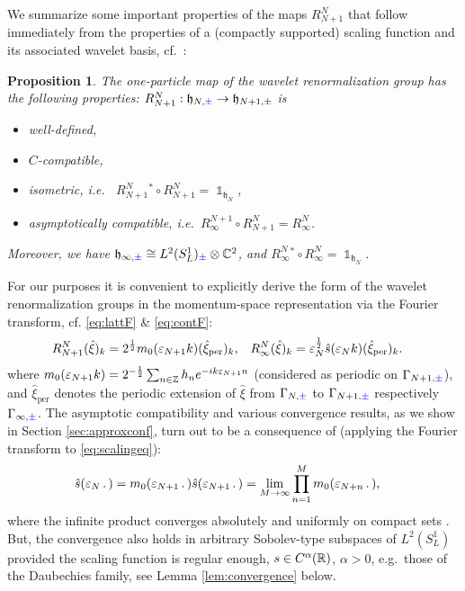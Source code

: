 \documentclass[a4paper, 11pt]{article}
\newcommand{\fh}{\mathfrak{h}}
\DeclareMathOperator{\1}{\mathds{1}}
\DeclareMathOperator{\per}{per}
\newtheorem{prop}[thm]{Proposition}
\begin{document}
We summarize some important properties of the maps $R^{N}_{N+1}$ that follow immediately from the properties of a (compactly supported) scaling function and its associated wavelet basis, cf.~\cite{MeyerWaveletsAndOperators, DaubechiesTenLecturesOn, MorinelliScalingLimitsOf}:
\begin{prop}
\label{prop:waveletrg}
The one-particle map of the wavelet renormalization group has the following properties: $R^{N}_{N+1}:\fh_{N,{\color{blue}\pm}}\rightarrow\fh_{N+1,\pm}$ is
\begin{itemize}
	\item[1.] well-defined,
	\item[2.] $C$-compatible,
	\item[3.] isometric, i.e.~ $R^{N}_{N+1}{}^{\!\!*}\circ R^{N}_{N+1} = \1_{\fh_{N}}$, 
	\item[4.] asymptotically compatible, i.e.~$R^{N+1}_{\infty}\circ R^{N}_{N+1} = R^{N}_{\infty}$.
\end{itemize}
Moreover, we have $\fh_{\infty,{\color{blue}\pm}}\cong L^{2}(S^{1}_{L})_{{\color{blue}\pm}}\otimes\C^{2}$, and $R^{N}_{\infty}{}^{*}\circ R^{N}_{\infty} = \1_{\fh_{N}}$.
\end{prop}
For our purposes it is convenient to explicitly derive the form of the wavelet renormalization groups in the momentum-space representation via the Fourier transform, cf. \eqref{eq:lattF} \& \eqref{eq:contF}:
\begin{align}
\label{eq:waveletrg1pF}
R^{N}_{N+1}(\hat{\xi})_{k} & = 2^{\frac{1}{2}}m_{0}(\vep_{N+1}k)(\hat{\xi}_{\per})_{k}, & R^{N}_{\infty}(\hat{\xi})_{k} & = \vep_{N}^{\frac{1}{2}}\hat{s}(\vep_{N}k)(\hat{\xi}_{\per})_{k}.
\end{align}
where $m_{0}(\varepsilon_{N+1}k) = 2^{-\frac{1}{2}}\sum_{n\in\mathbb{Z}}h_{n}e^{-ik\varepsilon_{N+1}n}$ (considered as periodic on $\Gamma_{N+1,{\color{blue}\pm}}$), and $\hat{\xi}_{\per}$ denotes the periodic extension of $\hat{\xi}$ from $\Gamma_{N,{\color{blue}\pm}}$ to $\Gamma_{N+1,{\color{blue}\pm}}$ respectively $\Gamma_{\infty,{\color{blue}\pm}}$. The asymptotic compatibility and various convergence results, as we show in Section \ref{sec:approxconf}, turn out to be a consequence of (applying the Fourier transform to \eqref{eq:scalingeq}):
\begin{align}
\label{eq:infprod}
\hat{s}(\vep_{N}\!\ .\!\ ) & = m_{0}(\vep_{N+1}\!\ .\!\ )\hat{s}(\vep_{N+1}\!\ .\!\ ) = \lim_{M\rightarrow\infty}\prod_{n=1}^{M}m_{0}(\vep_{N+n}\!\ .\!\ ),
\end{align}
where the infinite product converges absolutely and uniformly on compact sets \cite{DaubechiesTenLecturesOn}. But, the convergence also holds in arbitrary Sobolev-type subspaces of $L^{2}(S^{1}_{L})$ provided the scaling function is regular enough, $s\in C^{\alpha}(\mathbb{R})$, $\alpha>0$, e.g.~those of the Daubechies family, see Lemma \ref{lem:convergence} below. 
\end{document}
